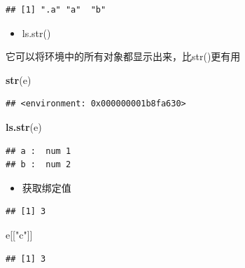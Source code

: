 \documentclass[]{book}
\newenvironment{Shaded}{\begin{snugshade}}{\end{snugshade}}
\newcommand{\KeywordTok}[1]{\textcolor[rgb]{0.13,0.29,0.53}{\textbf{#1}}}
\newcommand{\DecValTok}[1]{\textcolor[rgb]{0.00,0.00,0.81}{#1}}
\newcommand{\StringTok}[1]{\textcolor[rgb]{0.31,0.60,0.02}{#1}}
\newcommand{\OperatorTok}[1]{\textcolor[rgb]{0.81,0.36,0.00}{\textbf{#1}}}
\newcommand{\NormalTok}[1]{#1}
\providecommand{\tightlist}{%
  \setlength{\itemsep}{0pt}\setlength{\parskip}{0pt}}
\begin{document}
\begin{verbatim}
## [1] ".a" "a"  "b"
\end{verbatim}

\begin{itemize}
\tightlist
\item
  ls.str()
\end{itemize}

它可以将环境中的所有对象都显示出来，比str()更有用

\begin{Shaded}
\begin{Highlighting}[]
\KeywordTok{str}\NormalTok{(e)}
\end{Highlighting}
\end{Shaded}

\begin{verbatim}
## <environment: 0x000000001b8fa630>
\end{verbatim}

\begin{Shaded}
\begin{Highlighting}[]
\KeywordTok{ls.str}\NormalTok{(e)}
\end{Highlighting}
\end{Shaded}

\begin{verbatim}
## a :  num 1
## b :  num 2
\end{verbatim}

\begin{itemize}
\tightlist
\item
  获取绑定值
\end{itemize}

\begin{Shaded}
\end{Shaded}

\begin{verbatim}
## [1] 3
\end{verbatim}

\begin{Shaded}
\begin{Highlighting}[]
\NormalTok{e[[}\StringTok{"c"}\NormalTok{]]}
\end{Highlighting}
\end{Shaded}

\begin{verbatim}
## [1] 3
\end{verbatim}
\end{document}
